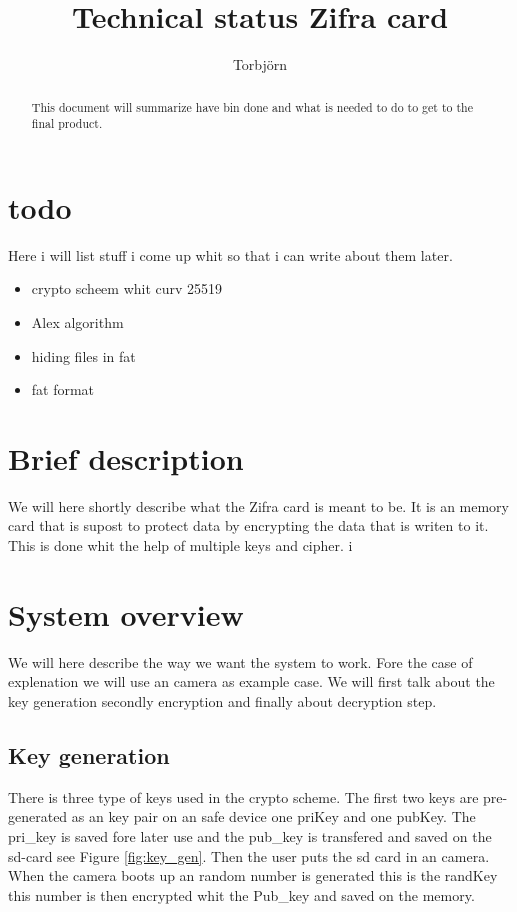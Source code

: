 \documentclass[]{article}
\title{Technical status Zifra card}
\author{Torbjörn}
\begin{document}
\maketitle
\tableofcontents
\newpage
\newpage

\begin{abstract}
This document will summarize have bin done and what is needed to do to get to the final product.
\end{abstract}

\newpage


\section{todo}
Here i will list stuff i come up whit so that i can write about them later.

\begin{itemize}
	\item crypto scheem whit curv 25519
	\item Alex algorithm
	\item hiding files in fat
	\item fat format
\end{itemize}




\section{Brief description}
We will here shortly describe what the Zifra card is meant to be.
It is an memory card that is supost to protect data by encrypting the data that is writen to it.
This is done whit the help of multiple \gls{keys} and \gls{cipher}.
i
\section{System overview}
We will here describe the way we want the system to work.
Fore the case of explenation we will use an camera as example case.
We will first talk about the key generation secondly encryption and finally about decryption step.

\subsection{Key generation}
There is three type of keys used in the crypto scheme.
The first two keys are pre-generated as an key pair on an safe device one \acrfull{priKey} and one \acrfull{pubKey}. 
The pri\_key is saved fore later use and the pub\_key is transfered and saved on the sd-card see Figure \ref{fig:key_gen}.
Then the user puts the sd card in an camera.
When the camera boots up an random number is generated this is the \acrfull{randKey} this number is then encrypted whit the Pub\_key and saved on the memory.
\end{document}
